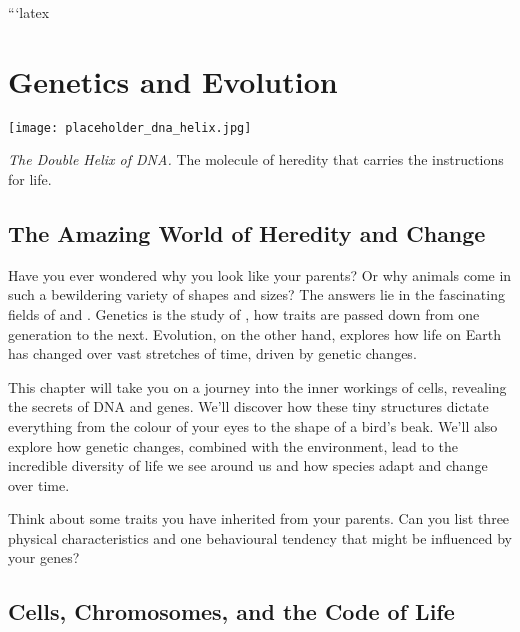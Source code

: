 ```latex
\chapter{Genetics and Evolution}

\begin{marginfigure}
\texttt{[image: placeholder\_dna\_helix.jpg]}
\caption*{\textit{The Double Helix of DNA.}  The molecule of heredity that carries the instructions for life.}
\end{marginfigure}

\section{The Amazing World of Heredity and Change}

Have you ever wondered why you look like your parents? Or why animals come in such a bewildering variety of shapes and sizes? The answers lie in the fascinating fields of  and . Genetics is the study of , how traits are passed down from one generation to the next. Evolution, on the other hand, explores how life on Earth has changed over vast stretches of time, driven by genetic changes.

This chapter will take you on a journey into the inner workings of cells, revealing the secrets of DNA and genes. We'll discover how these tiny structures dictate everything from the colour of your eyes to the shape of a bird's beak. We'll also explore how genetic changes, combined with the environment, lead to the incredible diversity of life we see around us and how species adapt and change over time.

\begin{marginnote}
\end{marginnote}

\begin{stopandthink}
Think about some traits you have inherited from your parents. Can you list three physical characteristics and one behavioural tendency that might be influenced by your genes?
\end{stopandthink}

\section{Cells, Chromosomes, and the Code of Life}

